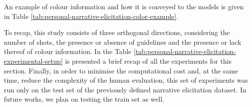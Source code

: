 
An example of colour information and how it is conveyed to the models is given in Table \ref{tab:personal-narrative-elicitation-color-example}. 

To recap, this study consists of three orthogonal directions, considering the number of shots, the presence or absence of guidelines and the presence or lack thereof of colour information. In the Table \ref{tab:personal-narrative-elicitation-experimental-setup} is presented a brief recap of all the experiments for this section. 
Finally, in order to minimise the computational cost and, at the same time, reduce the complexity of the human evaluation, this set of experiments was run only on the test set of the previously defined narrative elicitation dataset. In future works, we plan on testing the train set as well.
